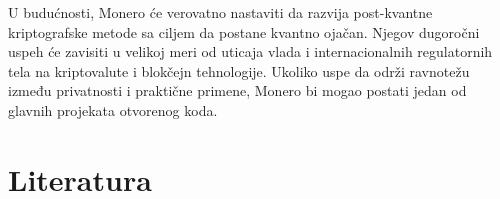\documentclass[12pt,a4paper]{article}
\begin{document}
U budućnosti, Monero će verovatno nastaviti da razvija post-kvantne kriptografske metode sa ciljem da postane kvantno ojačan. Njegov dugoročni uspeh će zavisiti u velikoj meri od uticaja vlada i internacionalnih regulatornih tela na kriptovalute i blokčejn tehnologije. Ukoliko uspe da održi ravnotežu između privatnosti i praktične primene, Monero bi mogao postati jedan od glavnih projekata otvorenog koda.


\newpage

\section{Literatura}



\end{document}
